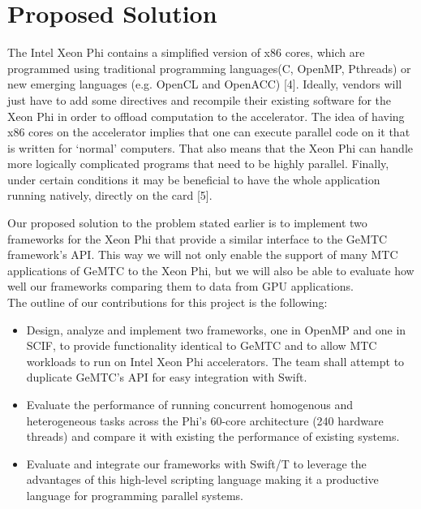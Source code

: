 \documentclass[10pt, conference, compsocconf]{IEEEtran}
\begin{document}
\section{Proposed Solution}
The Intel Xeon Phi contains a simplified version of x86 cores, which are programmed using traditional programming languages(C, OpenMP, Pthreads) or new emerging languages (e.g. OpenCL and OpenACC) [4]. Ideally, vendors will just have to add some directives and recompile their existing software for the Xeon Phi in order to offload computation to the accelerator. The idea of having x86 cores on the accelerator implies that one can execute parallel code on it that is written for ‘normal’ computers. That also means that the Xeon Phi can handle more logically complicated programs that need to be highly parallel. Finally, under certain conditions it may be beneficial to have the whole application running natively, directly on the card [5].

Our proposed solution to the problem stated earlier is to implement two frameworks for the Xeon Phi that provide a similar interface to the GeMTC framework’s API. This way we will not only enable the support of many MTC applications of GeMTC to the Xeon Phi, but we will also be able to evaluate how well our frameworks comparing them to data from GPU applications.\\


The outline of our contributions for this project is the following:\\


\begin{itemize}
  \item Design, analyze and implement two frameworks, one in OpenMP and one in SCIF, to provide functionality identical to GeMTC and to allow MTC workloads to run on Intel Xeon Phi accelerators. The team shall attempt to duplicate GeMTC’s API for easy integration with Swift.
  \item Evaluate the performance of running concurrent homogenous and heterogeneous tasks across the Phi’s 60-core architecture (240 hardware threads) and compare it with existing the performance of existing systems.
  \item Evaluate and integrate our frameworks with Swift/T to leverage the advantages of this high-level scripting language making it a productive language for programming parallel systems.
\end{itemize}
\end{document}
